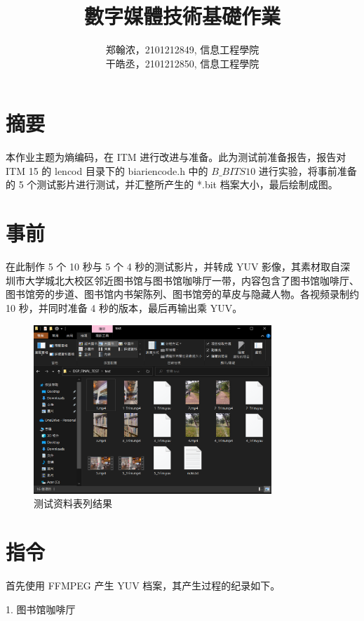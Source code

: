 \documentclass[10pt,UTF8]{ctexart}
\title{數字媒體技術基礎作業}
\author{郑翰浓，2101212849, 信息工程學院\\干皓丞，2101212850, 信息工程學院}
\begin{document}
\maketitle


\section{摘要}

本作业主题为熵编码，在 ITM 进行改进与准备。此为测试前准备报告，报告对 ITM 15 的 lencod 目录下的 biariencode.h 中的 $B\_BITS 10$ 进行实验，将事前准备的 5 个测试影片进行测试，并汇整所产生的 *.bit 档案大小，最后绘制成图。

\section{事前}

在此制作 5 个 10 秒与 5 个 4 秒的测试影片，并转成 YUV 影像，其素材取自深圳市大学城北大校区邻近图书馆与图书馆咖啡厅一带，内容包含了图书馆咖啡厅、图书馆旁的步道、图书馆内书架陈列、图书馆旁的草皮与隐藏人物。各视频录制约 10 秒，并同时准备 4 秒的版本，最后再输出乘 YUV。

\begin{figure}[H]
\centering 
\includegraphics[width=0.80\textwidth]{0.png} 
\caption{测试资料表列结果}
\label{Test}
\end{figure}

\section{指令}

首先使用 FFMPEG 产生 YUV 档案，其产生过程的纪录如下。

1. 图书馆咖啡厅
\end{document}
